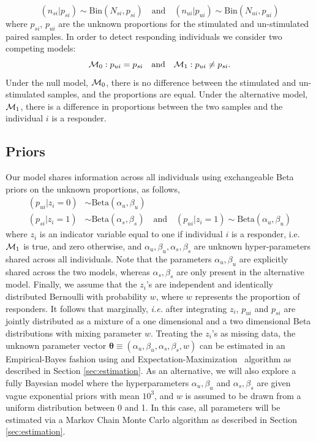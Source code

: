 \documentclass[11pt]{article}
\begin{document}
\begin{equation}
(n_{si}|p_{si}) \sim \mathrm{Bin}(N_{si},p_{si})\quad \text{and}\quad (n_{ui}|p_{ui}) \sim \mathrm{Bin}(N_{ui},p_{ui})\label{eq:bino_likelihood}
\end{equation}
where $p_{si}$, $p_{ui}$ are the unknown proportions for the stimulated and un-stimulated paired samples. In order to detect responding individuals we consider two competing models:
\begin{equation}
{\cal M}_0: p_{ui}=p_{si}\quad \text{and}\quad {\cal M}_1: p_{ui}\ne p_{si}. \label{eq:beta_prior}
\end{equation}
Under the null model, ${\cal M}_0$, there is no difference between the stimulated and un-stimulated samples, and the proportions are equal. Under the alternative model, ${\cal M}_1$, there is a difference in proportions between the two samples and the individual $i$ is a responder. 

\subsection{Priors}
Our model shares information across all individuals using exchangeable Beta priors on the unknown proportions, as follows, 
 \begin{align}
(p_{ui} | z_{i}=0)  &\sim \mathrm{Beta}(\alpha_u, \beta_u)\label{eq:prior-null}\\
(p_{si} | z_{i}=1)  &\sim \mathrm{Beta}(\alpha_s,\beta_s) \quad\mathrm{and}\quad (p_{ui}|z_{i}=1) \sim \mathrm{Beta}(\alpha_u, \beta_u) \label{eq:prior-alternative}
 \end{align}
where $z_i$ is an indicator variable equal to one if individual $i$ is a responder, i.e.  ${\cal M}_1$ is true, and zero otherwise, and $\alpha_u, \beta_u, \alpha_s,\beta_s$ are unknown hyper-parameters shared across all individuals. Note that the parameters $\alpha_u, \beta_u$ are explicitly shared across the two models, whereas $\alpha_s,\beta_s$ are only present in the alternative model. Finally, we assume that the $z_i$'s are independent and identically distributed Bernoulli with probability $w$, where $w$ represents the proportion of responders. It follows that marginally, \textit{i.e.} after integrating $z_i$, $p_{ui}$ and $p_{si}$ are jointly distributed as a mixture of a one dimensional and a two dimensional Beta distributions with mixing parameter $w$. Treating the $z_i$'s as missing data, the unknown parameter vector $\boldsymbol\theta\equiv(\alpha_u, \beta_u, \alpha_s,\beta_s, w)$ can be estimated in an Empirical-Bayes fashion using and Expectation-Maximization~\cite{Dempster:1977ul} algorithm as described in Section \ref{sec:estimation}. As an alternative, we will also explore a fully Bayesian model where the hyperparameters $\alpha_u, \beta_u$ and $\alpha_s, \beta_s$ are given vague exponential priors with mean $10^3$, and $w$ is assumed to be drawn from a uniform distribution between 0 and 1. In this case, all parameters will be estimated via a Markov Chain Monte Carlo algorithm as described in Section \ref{sec:estimation}. 
\end{document}
